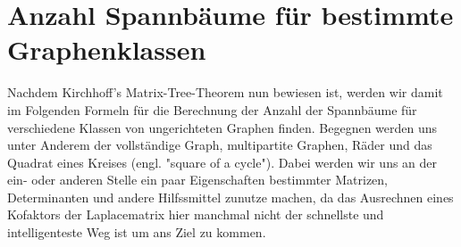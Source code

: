 \section{Anzahl Spannbäume für bestimmte Graphenklassen}
Nachdem Kirchhoff's Matrix-Tree-Theorem nun bewiesen ist, werden wir damit im Folgenden Formeln für die Berechnung der Anzahl der Spannbäume für verschiedene Klassen von ungerichteten Graphen finden. Begegnen werden uns unter Anderem der vollständige Graph, multipartite Graphen, Räder und das Quadrat eines Kreises (engl. "square of a cycle"). Dabei werden wir uns an der ein- oder anderen Stelle ein paar Eigenschaften bestimmter Matrizen, Determinanten und andere Hilfssmittel zunutze machen, da das Ausrechnen eines Kofaktors der Laplacematrix hier manchmal nicht der schnellste und intelligenteste Weg ist um ans Ziel zu kommen. 








